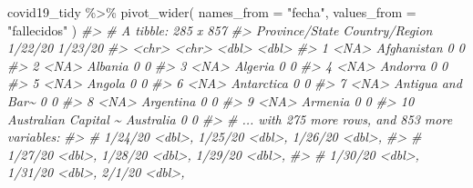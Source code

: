 \documentclass[
]{book}
\newenvironment{Shaded}{\begin{snugshade}}{\end{snugshade}}
\newcommand{\AttributeTok}[1]{\textcolor[rgb]{0.77,0.63,0.00}{#1}}
\newcommand{\CommentTok}[1]{\textcolor[rgb]{0.56,0.35,0.01}{\textit{#1}}}
\newcommand{\FunctionTok}[1]{\textcolor[rgb]{0.00,0.00,0.00}{#1}}
\newcommand{\NormalTok}[1]{#1}
\newcommand{\SpecialCharTok}[1]{\textcolor[rgb]{0.00,0.00,0.00}{#1}}
\newcommand{\StringTok}[1]{\textcolor[rgb]{0.31,0.60,0.02}{#1}}
\begin{document}
\begin{Shaded}
\begin{Highlighting}[]
\NormalTok{covid19\_tidy }\SpecialCharTok{\%\textgreater{}\%}
  \FunctionTok{pivot\_wider}\NormalTok{(}
    \AttributeTok{names\_from =} \StringTok{"fecha"}\NormalTok{,}
    \AttributeTok{values\_from =} \StringTok{"fallecidos"}
\NormalTok{  )}
\CommentTok{\#\textgreater{} \# A tibble: 285 x 857}
\CommentTok{\#\textgreater{}    \textasciigrave{}Province/State\textasciigrave{}     \textasciigrave{}Country/Region\textasciigrave{} \textasciigrave{}1/22/20\textasciigrave{} \textasciigrave{}1/23/20\textasciigrave{}}
\CommentTok{\#\textgreater{}    \textless{}chr\textgreater{}                \textless{}chr\textgreater{}                \textless{}dbl\textgreater{}     \textless{}dbl\textgreater{}}
\CommentTok{\#\textgreater{}  1 \textless{}NA\textgreater{}                 Afghanistan              0         0}
\CommentTok{\#\textgreater{}  2 \textless{}NA\textgreater{}                 Albania                  0         0}
\CommentTok{\#\textgreater{}  3 \textless{}NA\textgreater{}                 Algeria                  0         0}
\CommentTok{\#\textgreater{}  4 \textless{}NA\textgreater{}                 Andorra                  0         0}
\CommentTok{\#\textgreater{}  5 \textless{}NA\textgreater{}                 Angola                   0         0}
\CommentTok{\#\textgreater{}  6 \textless{}NA\textgreater{}                 Antarctica               0         0}
\CommentTok{\#\textgreater{}  7 \textless{}NA\textgreater{}                 Antigua and Bar\textasciitilde{}         0         0}
\CommentTok{\#\textgreater{}  8 \textless{}NA\textgreater{}                 Argentina                0         0}
\CommentTok{\#\textgreater{}  9 \textless{}NA\textgreater{}                 Armenia                  0         0}
\CommentTok{\#\textgreater{} 10 Australian Capital \textasciitilde{} Australia                0         0}
\CommentTok{\#\textgreater{} \# ... with 275 more rows, and 853 more variables:}
\CommentTok{\#\textgreater{} \#   \textasciigrave{}1/24/20\textasciigrave{} \textless{}dbl\textgreater{}, \textasciigrave{}1/25/20\textasciigrave{} \textless{}dbl\textgreater{}, \textasciigrave{}1/26/20\textasciigrave{} \textless{}dbl\textgreater{},}
\CommentTok{\#\textgreater{} \#   \textasciigrave{}1/27/20\textasciigrave{} \textless{}dbl\textgreater{}, \textasciigrave{}1/28/20\textasciigrave{} \textless{}dbl\textgreater{}, \textasciigrave{}1/29/20\textasciigrave{} \textless{}dbl\textgreater{},}
\CommentTok{\#\textgreater{} \#   \textasciigrave{}1/30/20\textasciigrave{} \textless{}dbl\textgreater{}, \textasciigrave{}1/31/20\textasciigrave{} \textless{}dbl\textgreater{}, \textasciigrave{}2/1/20\textasciigrave{} \textless{}dbl\textgreater{},}

\end{Highlighting}
\end{Shaded}
\end{document}
